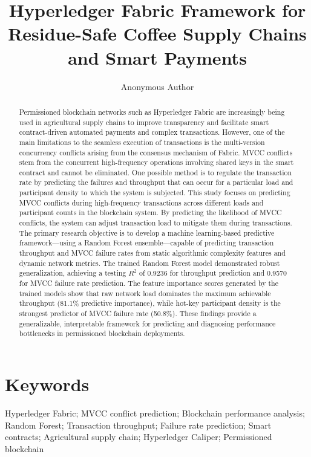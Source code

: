 \documentclass[manuscript,screen,nofonts]{acmart}
\title{Hyperledger Fabric Framework for Residue-Safe Coffee Supply Chains and Smart Payments}
\author{Anonymous Author}
\affiliation{%
	\institution{Anonymous Institution}
	\city{Anonymous City}
	\state{Anonymous State}
	\country{Anonymous Country}
}
\begin{document}
	
		\begin{abstract}
Permissioned blockchain networks such as Hyperledger Fabric are increasingly being used in agricultural supply chains to improve transparency and facilitate smart contract-driven automated payments and complex transactions. However, one of the main limitations to the seamless execution of transactions is the multi-version concurrency conflicts arising from the consensus mechanism of Fabric. MVCC conflicts stem from the concurrent high-frequency operations involving shared keys in the smart contract and cannot be eliminated. One possible method is to regulate the transaction rate by predicting the failures and throughput that can occur for a particular load and participant density to which the system is subjected. This study focuses on predicting MVCC conflicts during high-frequency transactions across different loads and participant counts in the blockchain system. By predicting the likelihood of MVCC conflicts, the system can adjust transaction load to mitigate them during transactions. The primary research objective is to develop a machine learning-based predictive framework---using a Random Forest ensemble---capable of predicting transaction throughput and MVCC failure rates from static algorithmic complexity features and dynamic network metrics. The trained Random Forest model demonstrated robust generalization, achieving a testing $R^2$ of 0.9236 for throughput prediction and 0.9570 for MVCC failure rate prediction. The feature importance scores generated by the trained models show that raw network load dominates the maximum achievable throughput (81.1\% predictive importance), while hot-key participant density is the strongest predictor of MVCC failure rate (50.8\%). These findings provide a generalizable, interpretable framework for predicting and diagnosing performance bottlenecks in permissioned blockchain deployments.
\end{abstract}
	
	\maketitle
	
	
	
	\section*{Keywords}
	Hyperledger Fabric; MVCC conflict prediction; Blockchain performance analysis; 
	Random Forest; Transaction throughput; Failure rate prediction; Smart contracts; 
	Agricultural supply chain; Hyperledger Caliper; Permissioned blockchain
	
\end{document}
